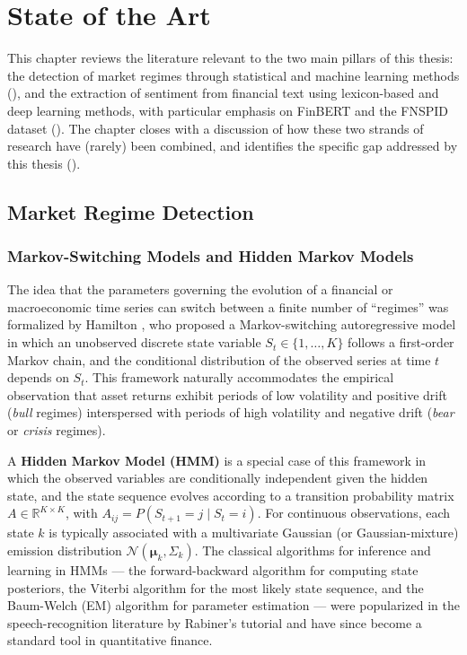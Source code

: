 \chapter{State of the Art}
\label{ch:soa}

This chapter reviews the literature relevant to the two main pillars of
this thesis: the detection of market regimes through statistical and
machine learning methods (), and the extraction of
sentiment from financial text using lexicon-based and deep learning
methods, with particular emphasis on FinBERT and the FNSPID dataset
(). The chapter closes with a discussion of how
these two strands of research have (rarely) been combined, and identifies
the specific gap addressed by this thesis ().

\section{Market Regime Detection}
\label{sec:soa-regimes}

\subsection{Markov-Switching Models and Hidden Markov Models}
\label{sec:soa-hmm}

The idea that the parameters governing the evolution of a financial or
macroeconomic time series can switch between a finite number of
``regimes'' was formalized by Hamilton \cite{hamilton1989}, who proposed a
Markov-switching autoregressive model in which an unobserved discrete
state variable $S_t \in \{1, \dots, K\}$ follows a first-order Markov
chain, and the conditional distribution of the observed series at time
$t$ depends on $S_t$. This framework naturally accommodates the empirical
observation that asset returns exhibit periods of low volatility and
positive drift (\emph{bull} regimes) interspersed with periods of high
volatility and negative drift (\emph{bear} or \emph{crisis} regimes).

A \textbf{Hidden Markov Model (HMM)} is a special case of this framework
in which the observed variables are conditionally independent given the
hidden state, and the state sequence evolves according to a transition
probability matrix $A \in \mathbb{R}^{K \times K}$, with
$A_{ij} = P(S_{t+1}=j \mid S_t = i)$. For continuous observations, each
state $k$ is typically associated with a multivariate Gaussian (or
Gaussian-mixture) emission distribution
$\mathcal{N}(\boldsymbol{\mu}_k, \Sigma_k)$. The classical algorithms for
inference and learning in HMMs --- the forward-backward algorithm for
computing state posteriors, the Viterbi algorithm for the most likely
state sequence, and the Baum-Welch (EM) algorithm for parameter
estimation --- were popularized in the speech-recognition literature by
Rabiner's tutorial \cite{rabiner1989hmm} and have since become a standard
tool in quantitative finance.

